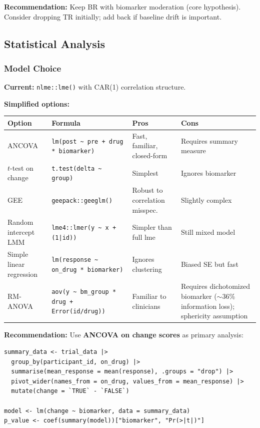 \documentclass[11pt]{article}
\begin{document}
\textbf{Recommendation:} Keep BR with biomarker moderation (core
hypothesis). Consider dropping TR initially; add back if baseline drift
is important.

\subsection{Statistical Analysis}

\subsubsection{Model Choice}

\textbf{Current:} \texttt{nlme::lme()} with CAR(1) correlation structure.

\textbf{Simplified options:}

\begin{table}[h]
\centering\small
\begin{tabular}{@{}L{2.2cm}L{4.8cm}L{3cm}L{3.5cm}@{}}
\toprule
Option & Formula & Pros & Cons \\
\midrule
ANCOVA & \texttt{lm(post \textasciitilde{} pre + drug * biomarker)} & Fast, familiar, closed-form & Requires summary measure \\
$t$-test on change & \texttt{t.test(delta \textasciitilde{} group)} & Simplest & Ignores biomarker \\
GEE & \texttt{geepack::geeglm()} & Robust to correlation misspec. & Slightly complex \\
Random intercept LMM & \texttt{lme4::lmer(y \textasciitilde{} x + (1|id))} & Simpler than full lme & Still mixed model \\
Simple linear regression & \texttt{lm(response \textasciitilde{} on\_drug * biomarker)} & Ignores clustering & Biased SE but fast \\
RM-ANOVA & \texttt{aov(y \textasciitilde{} bm\_group * drug + Error(id/drug))} & Familiar to clinicians & Requires dichotomized biomarker ($\sim$36\% information loss); sphericity assumption \\
\bottomrule
\end{tabular}
\end{table}

\textbf{Recommendation:} Use \textbf{ANCOVA on change scores} as
primary analysis:

\begin{Verbatim}[fontsize=\small]
summary_data <- trial_data |>
  group_by(participant_id, on_drug) |>
  summarise(mean_response = mean(response), .groups = "drop") |>
  pivot_wider(names_from = on_drug, values_from = mean_response) |>
  mutate(change = `TRUE` - `FALSE`)

model <- lm(change ~ biomarker, data = summary_data)
p_value <- coef(summary(model))["biomarker", "Pr(>|t|)"]
\end{Verbatim}
\end{document}
